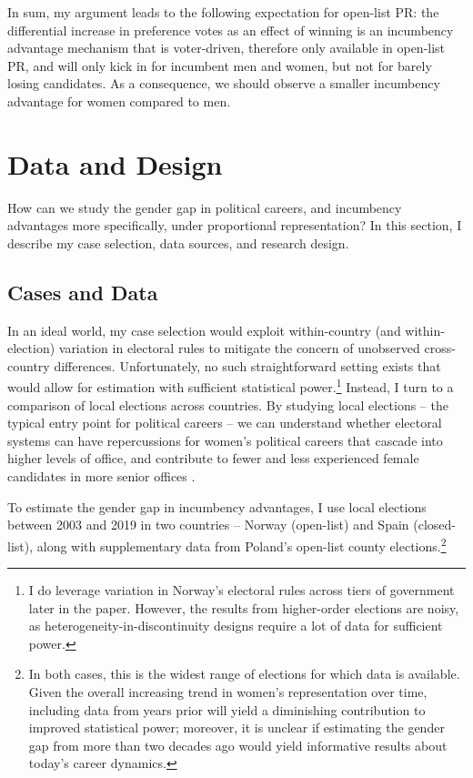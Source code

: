 \documentclass[12pt]{article}
\begin{document}
In sum, my argument leads to the following expectation for open-list PR: the differential increase in preference votes as an effect of winning is an incumbency advantage mechanism that is voter-driven, therefore only available in open-list PR, and will only kick in for incumbent men and women, but not for barely losing candidates. As a consequence, we should observe a smaller incumbency advantage for women compared to men.


\section{Data and Design}

How can we study the gender gap in political careers, and incumbency advantages more specifically, under proportional representation? In this section, I describe my case selection, data sources, and research design.

\subsection{Cases and Data}

In an ideal world, my case selection would exploit within-country (and within-election) variation in electoral rules to mitigate the concern of unobserved cross-country differences. Unfortunately, no such straightforward setting exists that would allow for estimation with sufficient statistical power.\footnote{I do leverage variation in Norway's electoral rules across tiers of government later in the paper. However, the results from higher-order elections are noisy, as heterogeneity-in-discontinuity designs require a lot of data for sufficient power.} Instead, I turn to a comparison of local elections across countries. By studying local elections -- the typical entry point for political careers -- we can understand whether electoral systems can have repercussions for women's political careers that cascade into higher levels of office, and contribute to fewer and less experienced female candidates in more senior offices \citep{cirone2020}.

To estimate the gender gap in incumbency advantages, I use local elections between 2003 and 2019 in two countries -- Norway (open-list) and Spain (closed-list), along with supplementary data from Poland's open-list county elections.\footnote{In both cases, this is the widest range of elections for which data is available. Given the overall increasing trend in women's representation over time, including data from years prior will yield a diminishing contribution to improved statistical power; moreover, it is unclear if estimating the gender gap from more than two decades ago would yield informative results about today's career dynamics.}
\end{document}
